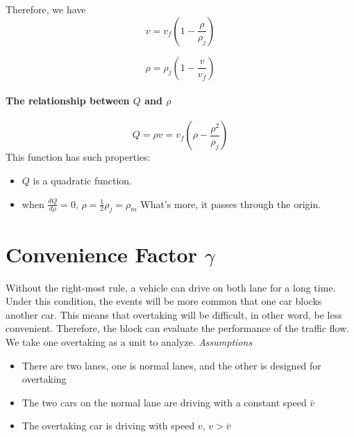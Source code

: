Therefore, we have 
\begin{equation}
v = v_f(1 - \frac{\rho}{\rho_j})
\end{equation}

\begin{equation}
\rho = \rho_j(1 - \frac{v}{v_f})
\end {equation}

\paragraph{The relationship between $Q$ and $\rho$ }
\begin{equation}
Q = \rho v = v_f(\rho - \frac{\rho^2}{\rho_j})
\end{equation}
This function has such properties:

\begin{itemize}
\item $Q$ is a quadratic function. 
\item when $\frac{dQ}{d \rho} = 0$, 
$\rho = \frac{1}{2}\rho_j = \rho_m $
What's more, it passes through the origin.
\end{itemize}




\section{Convenience Factor $ \gamma $}
\label{sec: Convenience Factor}

Without the right-most rule, a vehicle can drive on both lane for a long time. Under this condition, the events will be more common that one car blocks another car. This means that overtaking will be difficult,
in other word, be less convenient. Therefore, the block can evaluate the performance of the traffic flow.
We take one overtaking as a unit to
analyze. 
\emph{Assumptions}
\begin{itemize}
\item There are two lanes, one is normal lanes,
and the other is designed for overtaking
\item The two cars on the normal lane are driving
with a constant speed $\bar{v}$
\item The overtaking car is driving with speed
$v$, $v > \bar{v}$
\end{itemize}

